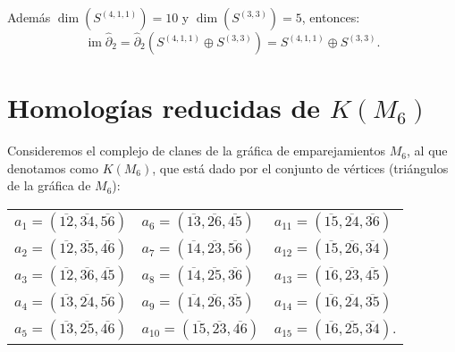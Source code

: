 \documentclass[12pt]{book}
\theoremstyle{definition}
\DeclareMathOperator{\im}{im}
\newcounter{in}
\begin{document}
  Además $\dim(S^{(4,1,1)})=10$ y $\dim(S^{(3,3)})=5$, entonces:
  $$\im\widehat\partial_{2}=\widehat\partial_{2}(S^{(4,1,1)}\oplus
  S^{(3,3)})=S^{(4,1,1)}\oplus S^{(3,3)}.$$

\section{Homologías reducidas de $K(M_{6})$}
\label{hom-red-KM6}

Consideremos el complejo de clanes de la gráfica de emparejamientos
$M_{6}$, al que denotamos como $K(M_{6})$, que está dado por el
conjunto de vértices (triángulos de la gráfica de
$M_{6}$):

\begin{center}
  \begin{tabular}[h]{lll}
    $a_{1}=(\overline{12},\overline{34},\overline{56})$&$a_{6}=(\overline{13},\overline{26},\overline{45})$&$a_{11}=(\overline{15},\overline{24},\overline{36})$  \\
    $a_{2}=(\overline{12},\overline{35},\overline{46})$&$a_{7}=(\overline{14},\overline{23},\overline{56})$&$a_{12}=(\overline{15},\overline{26},\overline{34})$  \\
    $a_{3}=(\overline{12},\overline{36},\overline{45})$&$a_{8}=(\overline{14},\overline{25},\overline{36})$&$a_{13}=(\overline{16},\overline{23},\overline{45})$  \\
    $a_{4}=(\overline{13},\overline{24},\overline{56})$&$a_{9}=(\overline{14},\overline{26},\overline{35})$&$a_{14}=(\overline{16},\overline{24},\overline{35})$ \\
    $a_{5}=(\overline{13},\overline{25},\overline{46})$&$a_{10}=(\overline{15},\overline{23},\overline{46})$&$a_{15}=(\overline{16},\overline{25},\overline{34}).$  
  \end{tabular}
\end{center}
\end{document}
